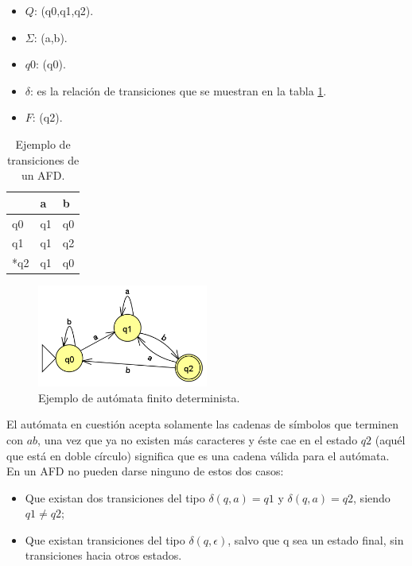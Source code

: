 \begin{itemize}
\item \textbf{$Q$}: (q0,q1,q2).
\item \textbf{$\Sigma$}: (a,b).
\item \textbf{$q0$}: (q0).
\item \textbf{$\delta$}: es la relación de transiciones que se muestran en la tabla \ref{table:AFN_CONVERTIDO}.
\item \textbf{$F$}: (q2).
\end{itemize}

\begin{table}[hbtp]
\centering
   \caption{Ejemplo de transiciones de un AFD.}
   \begin{tabular}{ | l | l | l |}
   \hline
     \rowcolor[gray]{0.5}
          &   a  &  b   \\ \hline
       q0 &  q1  & q0   \\ \hline   
       q1 &  q1  & q2   \\ \hline
      *q2 &  q1  & q0   \\ \hline
   \end{tabular}
   \label{table:AFN_CONVERTIDO}
\end{table}

    \begin{figure}[hbtp]
        \centering
            \includegraphics[width=0.5\textwidth]{MarcoTeorico/Imagenes/AFN_CONVERTIDO.png}
            \caption{Ejemplo de autómata finito determinista.}     
            \label{fig:AFN_CONVERTIDO.png}
    \end{figure} 

\hspace*{1cm}El autómata en cuestión acepta solamente las cadenas de símbolos que terminen con $ab$, una vez que ya no existen más caracteres y éste cae en el estado $q2$ (aquél que está en doble círculo) significa que es una cadena válida para el autómata.\\
\hspace*{1cm}En un AFD no pueden darse ninguno de estos dos casos:
    \begin{itemize}
        \item Que existan dos transiciones del tipo $\delta(q,a)=q1$ y $\delta(q,a)=q2$, siendo $q1 \neq q2$;
        \item Que existan transiciones del tipo $\delta(q,\epsilon)$, salvo que q sea un estado final, sin transiciones hacia otros estados.
    \end{itemize}    
